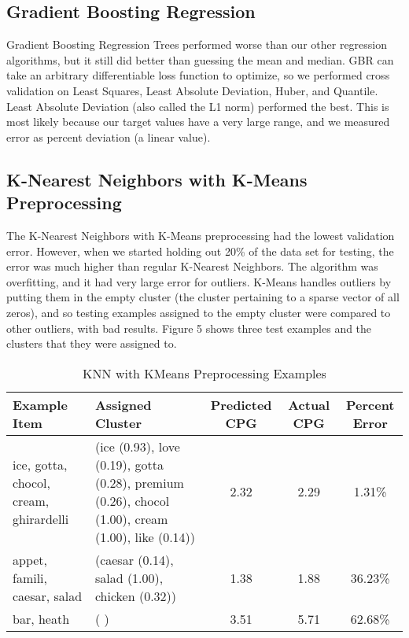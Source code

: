 \documentclass{article}
\begin{document}
\subsection{Gradient Boosting Regression}
Gradient Boosting Regression Trees performed worse than our other regression algorithms, but it still did better than guessing the mean and median. GBR can take an arbitrary differentiable loss function to optimize, so we performed cross validation on Least Squares, Least Absolute Deviation, Huber, and Quantile. Least Absolute Deviation (also called the L1 norm) performed the best. This is most likely because our target values have a very large range, and we measured error as percent deviation (a linear value).

\subsection{K-Nearest Neighbors with K-Means Preprocessing}
The K-Nearest Neighbors with K-Means preprocessing had the lowest validation error. However, when we started holding out 20\% of the data set for testing, the error was much higher than regular K-Nearest Neighbors. The algorithm was overfitting, and it had very large error for outliers. K-Means handles outliers by putting them in the empty cluster (the cluster pertaining to a sparse vector of all zeros), and so testing examples assigned to the empty cluster were compared to other outliers, with bad results. Figure 5 shows three test examples and the clusters that they were assigned to.

\begin{table}[ht]
\caption{KNN with KMeans Preprocessing Examples} %
\centering %
\begin{tabular}{|p{4cm}|p{4cm}|c|c|c|} %
\hline\hline %
Example Item & Assigned Cluster & Predicted CPG & Actual CPG & Percent Error \\ [0.5ex]
\hline %
ice, gotta, chocol, cream, ghirardelli & (ice (0.93), love (0.19), gotta (0.28), premium (0.26), chocol (1.00), cream (1.00), like (0.14)) & 2.32 & 2.29 & 1.31\% \\ [1ex] %
\hline
appet, famili, caesar, salad & (caesar (0.14), salad (1.00), chicken (0.32)) & 1.38 & 1.88 & 36.23\% \\ [1ex]
\hline
bar, heath & ( ) & 3.51 & 5.71 & 62.68\% \\ [1ex] %
\hline %
\end{tabular}
\label{table:nonlin} %
\end{table}
\end{document}
